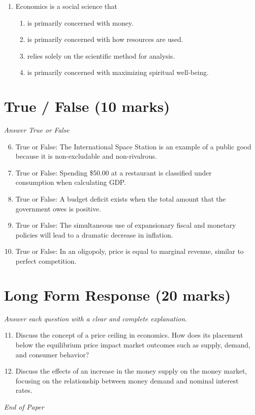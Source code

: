 \documentclass[12pt]{article}
\begin{document}
\begin{enumerate}[label=\arabic*.]
\begin{enumerate}[label=(\alph*)]
    \item A higher price.
    \item A lower level of output.
\end{enumerate}
\item Economics is a social science that
\begin{enumerate}[label=(\alph*)]
    \item is primarily concerned with money.
    \item is primarily concerned with how resources are used.
    \item relies solely on the scientific method for analysis.
    \item is primarily concerned with maximizing spiritual well-being.
\end{enumerate}
\end{enumerate}

\section*{True / False (10 marks)}
\textit{Answer True or False}
\begin{enumerate}[label=\arabic*.]
\setcounter{enumi}{5}
\item True or False: The International Space Station is an example of a public good because it is non-excludable and non-rivalrous.
\item True or False: Spending \$50.00 at a restaurant is classified under consumption when calculating GDP.
\item True or False: A budget deficit exists when the total amount that the government owes is positive.
\item True or False: The simultaneous use of expansionary fiscal and monetary policies will lead to a dramatic decrease in inflation.
\item True or False: In an oligopoly, price is equal to marginal revenue, similar to perfect competition.
\end{enumerate}

\section*{Long Form Response (20 marks)}
\textit{Answer each question with a clear and complete explanation.}
\begin{enumerate}[label=\arabic*.]
\setcounter{enumi}{10}
\item Discuss the concept of a price ceiling in economics. How does its placement below the equilibrium price impact market outcomes such as supply, demand, and consumer behavior?
\item Discuss the effects of an increase in the money supply on the money market, focusing on the relationship between money demand and nominal interest rates.
\end{enumerate}

\vfill
\noindent\textit{End of Paper}
\end{document}
